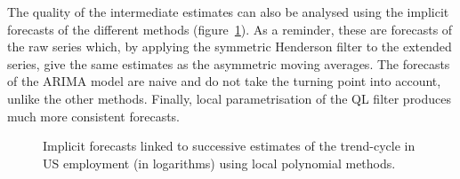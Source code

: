 \documentclass[
]{article}
\newcommand\1{\mathds{1}}
\begin{document}
The quality of the intermediate estimates can also be analysed using the
implicit forecasts of the different methods
(figure~\ref{fig-ce16ov-previmp-lp}). As a reminder, these are forecasts
of the raw series which, by applying the symmetric Henderson filter to
the extended series, give the same estimates as the asymmetric moving
averages. The forecasts of the ARIMA model are naive and do not take the
turning point into account, unlike the other methods. Finally, local
parametrisation of the QL filter produces much more consistent
forecasts.

\begin{figure}[H]

\caption{\label{fig-ce16ov-previmp-lp}Implicit forecasts linked to
successive estimates of the trend-cycle in US employment (in logarithms)
using local polynomial methods.}


\end{figure}%
\end{document}

